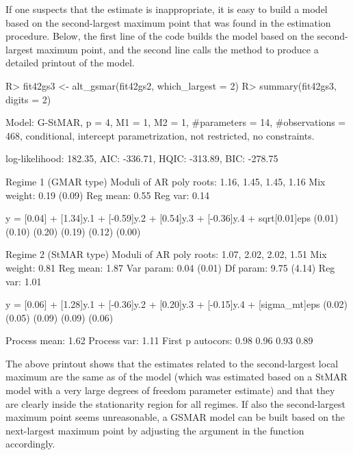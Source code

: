 \documentclass[nojss]{jss} %
\begin{document}
If one suspects that the estimate is inappropriate, it is easy to build a model based on the second-largest maximum point that was found in the estimation procedure. Below, the first line of the code builds the model based on the second-largest maximum point, and the second line calls the  method to produce a detailed printout of the model.
%
\begin{CodeChunk}
\begin{CodeInput}
R> fit42gs3 <- alt_gsmar(fit42gs2, which_largest = 2)
R> summary(fit42gs3, digits = 2)
\end{CodeInput}
\begin{CodeOutput}
Model:
 G-StMAR, p = 4, M1 = 1, M2 = 1, #parameters = 14, #observations = 468,
 conditional, intercept parametrization, not restricted, no constraints.

 log-likelihood: 182.35, AIC: -336.71, HQIC: -313.89, BIC: -278.75

Regime 1 (GMAR type)
Moduli of AR poly roots: 1.16, 1.45, 1.45, 1.16
Mix weight: 0.19 (0.09)
Reg mean: 0.55
Reg var:  0.14

y = [0.04] + [1.34]y.1 + [-0.59]y.2 + [0.54]y.3 + [-0.36]y.4 + sqrt[0.01]eps
    (0.01)   (0.10)       (0.20)      (0.19)       (0.12)          (0.00)

Regime 2 (StMAR type)
Moduli of AR poly roots: 1.07, 2.02, 2.02, 1.51
Mix weight: 0.81
Reg mean: 1.87
Var param: 0.04 (0.01)
Df param: 9.75 (4.14)
Reg var:  1.01

y = [0.06] + [1.28]y.1 + [-0.36]y.2 + [0.20]y.3 + [-0.15]y.4 + [sigma_mt]eps
    (0.02)   (0.05)       (0.09)      (0.09)       (0.06)

Process mean: 1.62
Process var:  1.11
First p autocors: 0.98 0.96 0.93 0.89
\end{CodeOutput}
\end{CodeChunk}
%
The above printout shows that the estimates related to the second-largest local maximum are the same as of the model  (which was estimated based on a StMAR model with a very large degrees of freedom parameter estimate) and that they are clearly inside the stationarity region for all regimes. If also the second-largest maximum point seems unreasonable, a GSMAR model can be built based on the next-largest maximum point by adjusting the argument  in the function  accordingly.
\end{document}
